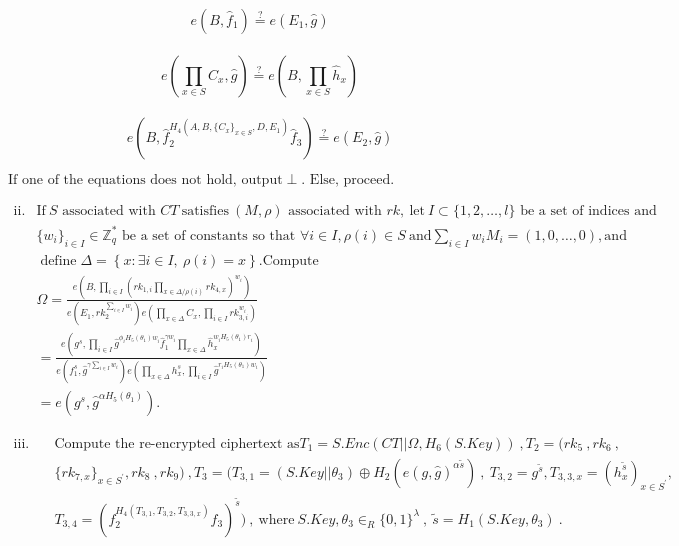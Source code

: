 \documentclass[runningheads]{llncs}
\begin{document}
\begin{equation}
e(B,\hat{f}_1) \stackrel{?}{=} e(E_1,\hat{g})
\end{equation}
\\
\begin{equation}
e\left(\prod_{x\in S} C_x,\hat{g}\right) \stackrel{?}{=} e\left(B,\prod_{x\in S}\hat{h}_x\right)
\end{equation}
\\
\begin{equation}
e(B,\hat{f}_2^{H_4(A,B,\{C_x\}_{x\in S},D,E_1)}\hat{f}_3) \stackrel{?}{=} e(E_2,\hat{g})
\end{equation}

$\text{If one of the equations does not hold, output}\perp.\text{ Else, proceed.}$    

$\begin{aligned}\mathrm{ii.} & \mathrm{If~}S\text{ associated with }CT\mathrm{~satisfies~}(M,\rho)\text{ associated with }rk,\mathrm{~let~}I\subset\{1,2,\ldots,l\}\text{ be a set of indices and}\\  & \{w_{i}\}_{i\in I}\in\mathbb{Z}_{q}^{*}\text{ be a set of constants so that }\forall i\in I,\rho(i)\in S\mathrm{~and}\sum_{i\in I}w_{i}M_{i}=\left(1,0,\ldots,0\right),\mathrm{and}\\  & \operatorname{define}\Delta=\left\{x:\exists i\in I,\mathrm{~}\rho(i)=x\right\}.\mathrm{Compute}\\  & \Omega=\frac{e\left(B,\prod_{i\in I}\left(rk_{1,i}\prod_{x\in\Delta/\rho(i)}rk_{4,x}\right)^{w_i}\right)}{e\left(E_1,rk_2^{\sum_{i\in I}w_i}\right)e\left(\prod_{x\in\Delta}C_x,\prod_{i\in I}rk_{3,i}^{w_i}\right)}\\  & =\frac{e\left(g^s,\prod_{i\in I}\hat{g}^{\phi_iH_5(\theta_1)w_i}\hat{f}_1^{\gamma w_i}\prod_{x\in\Delta}\hat{h}_x^{w_iH_5(\theta_1)r_i}\right)}{e\left(f_1^s,\hat{g}^{\gamma\sum_{i\in I}w_i}\right)e\left(\prod_{x\in\Delta}h_x^s,\prod_{i\in I}\hat{g}^{r_iH_5(\theta_1)w_i}\right)}\\  & =e(g^{s},\hat{g}^{\alpha H_5(\theta_1)}).\end{aligned}$

$\begin{aligned}\mathrm{iii.}&\quad\text{Compute the re-encrypted ciphertext as}T_{1}=S.Enc(CT||\Omega,H_{6}(S.Key))\mathrm{~,}T_{2}=(rk_{5}\mathrm{~,}rk_{6}\mathrm{~,}\\&\quad\{rk_{7,x}\}_{x\in S^{\prime}},rk_{8}\mathrm{~,}rk_{9})\mathrm{~,}T_{3}=(T_{3,1}=(S.Key||\theta_{3})\oplus H_{2}(e(g,\hat{g})^{\alpha\tilde{s}})\mathrm{~,~}T_{3,2}=g^{\tilde{s}},T_{3,3,x}=(h_{x}^{\tilde{s}})_{x\in S^{\prime}},\\&\quad T_{3,4}=(f_{2}^{H_{4}(T_{3,1},T_{3,2},T_{3,3,x})}f_{3})^{\tilde{s}})\mathrm{~,~where~}S.Key,\theta_{3}\in_{R}\{0,1\}^{\lambda}\mathrm{~,~}\tilde{s}=H_{1}(S.Key,\theta_{3})\mathrm{~.}\end{aligned}$
\end{document}
